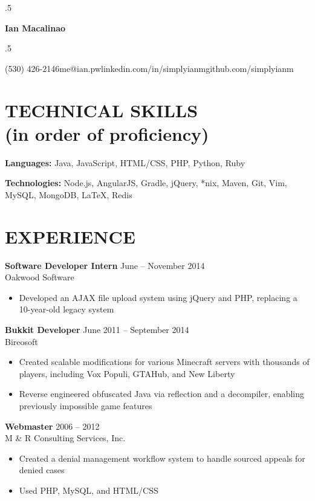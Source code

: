 \documentclass[margin, 10pt]{res} %
\makeatletter
\def\ULurl@#1{\hyper@linkurl{\ULurl@@{#1}}{#1}}
\DeclareRobustCommand*\ULurl{\hyper@normalise\ULurl@}
\newcommand*{\its}{\hspace{0.8cm}}
\makeatother
\begin{document}
\moveleft.5\hoffset\centerline{\Huge\bf Ian Macalinao}
\bigskip
\moveleft.5\hoffset\centerline{(530) 426-2146\its{}me@ian.pw\its{}\ULurl{http://ian.pw}\its{}linkedin.com/in/simplyianm\its{}github.com/simplyianm}

\begin{resume}

  \section{TECHNICAL SKILLS \\ \textnormal{(in order of proficiency)}} 

  {\bf Languages:} Java, JavaScript, HTML/CSS, PHP, Python, Ruby

  {\bf Technologies:} Node.js, AngularJS, Gradle, jQuery, *nix, Maven, Git, Vim, MySQL, MongoDB, \LaTeX, Redis

  \section{EXPERIENCE}

  {\bf Software Developer Intern} \hfill June -- November 2014 \\
  Oakwood Software

  \begin{itemize} \itemsep -2pt
    \item Developed an AJAX file upload system using jQuery and PHP, replacing a 10-year-old legacy system
  \end{itemize}

  {\bf Bukkit Developer} \hfill June 2011 -- September 2014 \\
  Bireosoft

  \begin{itemize} \itemsep -2pt
    \item Created scalable modifications for various Minecraft servers with thousands of players, including Vox Populi, GTAHub, and New Liberty
    \item Reverse engineered obfuscated Java via reflection and a decompiler, enabling previously impossible game features
  \end{itemize}

  {\bf Webmaster} \hfill 2006 -- 2012 \\
  M \& R Consulting Services, Inc.
  \begin{itemize} \itemsep -2pt
    \item Created a denial management workflow system to handle sourced appeals for denied cases
    \item Used PHP, MySQL, and HTML/CSS
  \end{itemize} 


\end{resume}
\end{document}
